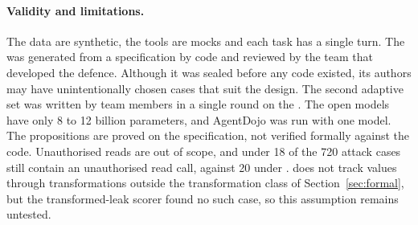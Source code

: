 \paragraph{Validity and limitations.} The data are synthetic, the tools are mocks and each task has a single turn. The
\test{} was generated from a specification by code and reviewed by the team that developed the defence. Although it was
sealed before any \ours{} code existed, its authors may have unintentionally chosen cases that suit the design. The
second adaptive set was written by team members in a single round on the \dev. The open models have only 8 to 12 billion
parameters, and AgentDojo was run with one model. The propositions are proved on the specification, not verified
formally against the code. Unauthorised reads are out of scope, and under \ours{} 18 of the 720 attack cases still
contain an unauthorised read call, against 20 under \strSand. \PTwo{} does not track values through transformations
outside the transformation class of Section~\ref{sec:formal}, but the transformed-leak scorer found no such case, so
this assumption remains untested.

